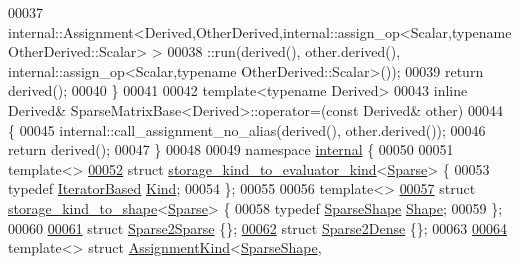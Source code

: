 \begin{DoxyCode}
00037   internal::Assignment<Derived,OtherDerived,internal::assign\_op<Scalar,typename OtherDerived::Scalar> >
00038           ::run(derived(), other.derived(), internal::assign\_op<Scalar,typename OtherDerived::Scalar>());
00039   \textcolor{keywordflow}{return} derived();
00040 \}
00041 
00042 \textcolor{keyword}{template}<\textcolor{keyword}{typename} Derived>
00043 \textcolor{keyword}{inline} Derived& SparseMatrixBase<Derived>::operator=(\textcolor{keyword}{const} Derived& other)
00044 \{
00045   internal::call\_assignment\_no\_alias(derived(), other.derived());
00046   \textcolor{keywordflow}{return} derived();
00047 \}
00048 
00049 \textcolor{keyword}{namespace }\hyperlink{namespaceinternal}{internal} \{
00050 
00051 \textcolor{keyword}{template}<>
\hyperlink{struct_eigen_1_1internal_1_1storage__kind__to__evaluator__kind_3_01_sparse_01_4}{00052} \textcolor{keyword}{struct }\hyperlink{struct_eigen_1_1internal_1_1storage__kind__to__evaluator__kind}{storage\_kind\_to\_evaluator\_kind}<\hyperlink{struct_eigen_1_1_sparse}{Sparse}> \{
00053   \textcolor{keyword}{typedef} \hyperlink{struct_eigen_1_1internal_1_1_iterator_based}{IteratorBased} \hyperlink{struct_eigen_1_1internal_1_1_iterator_based}{Kind};
00054 \};
00055 
00056 \textcolor{keyword}{template}<>
\hyperlink{struct_eigen_1_1internal_1_1storage__kind__to__shape_3_01_sparse_01_4}{00057} \textcolor{keyword}{struct }\hyperlink{struct_eigen_1_1internal_1_1storage__kind__to__shape}{storage\_kind\_to\_shape}<\hyperlink{struct_eigen_1_1_sparse}{Sparse}> \{
00058   \textcolor{keyword}{typedef} \hyperlink{struct_eigen_1_1_sparse_shape}{SparseShape} \hyperlink{struct_eigen_1_1_sparse_shape}{Shape};
00059 \};
00060 
\hyperlink{struct_eigen_1_1internal_1_1_sparse2_sparse}{00061} \textcolor{keyword}{struct }\hyperlink{struct_eigen_1_1internal_1_1_sparse2_sparse}{Sparse2Sparse} \{\};
\hyperlink{struct_eigen_1_1internal_1_1_sparse2_dense}{00062} \textcolor{keyword}{struct }\hyperlink{struct_eigen_1_1internal_1_1_sparse2_dense}{Sparse2Dense}  \{\};
00063 
\hyperlink{struct_eigen_1_1internal_1_1_assignment_kind_3_01_sparse_shape_00_01_sparse_shape_01_4}{00064} \textcolor{keyword}{template}<> \textcolor{keyword}{struct }\hyperlink{struct_eigen_1_1internal_1_1_assignment_kind}{AssignmentKind}<\hyperlink{struct_eigen_1_1_sparse_shape}{SparseShape}, 

\end{DoxyCode}
